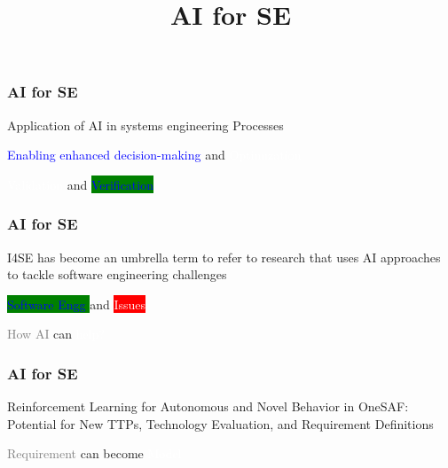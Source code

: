 

\title[Systems Engineering]{ AI for SE } 





\newpage
\begin{frame}
\frametitle{ AI for SE }
\begin{block}{Application of AI in systems engineering Processes}

 
  \vspace{1cm} 

 \colorbox{gray!35}{ \textcolor{blue}{ Enabling enhanced decision-making } }  and
   \colorbox{blue!47}{ \textcolor{white}{ Optimization } }


 \vspace{1cm} 
 
    \colorbox{blue!47}{ \textcolor{white}{ Validation } } and 
  \colorbox{green}{ \textcolor{blue}{ Verification } }
  
 
\end{block}
\end{frame}

\newpage
\begin{frame}
\frametitle{ AI for SE }
\begin{block}{I4SE has become an umbrella term to refer to research that uses AI approaches to tackle software engineering challenges}

 
  \vspace{1cm} 

 \colorbox{green}{ \textcolor{blue}{ Software Engg } }  and
   \colorbox{red}{ \textcolor{white}{ Issues } }


  \vspace{1cm} 

 \colorbox{gray!35}{ \textcolor{gray}{ How AI } }   can
   \colorbox{blue!47}{ \textcolor{white}{  help? } }


\end{block}
\end{frame}





\newpage
\begin{frame}
\frametitle{ AI for SE }
\begin{block}{Reinforcement Learning for Autonomous and Novel Behavior in OneSAF: Potential for New TTPs, Technology Evaluation, and Requirement Definitions}

 


  \vspace{1cm} 

 \colorbox{gray!35}{ \textcolor{gray}{ Requirement } }   can become
   \colorbox{blue!47}{ \textcolor{white}{  Model } }


\end{block}
\end{frame}




